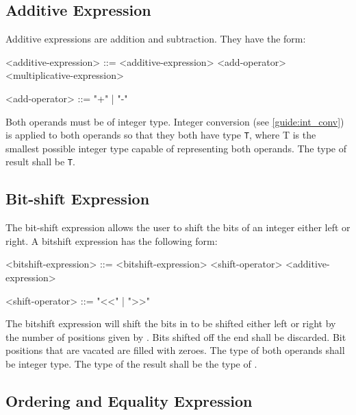 \subsection{Additive Expression} \label{guide:add_expr}

Additive expressions are addition and subtraction. They have the form: 

\begin{minip}
\begin{grammar}
<additive-expression> ::= <additive-expression> 
<add-operator> <multiplicative-expression>

<add-operator> ::= "+" | "-"
\end{grammar}
\end{minip}

Both operands must be of integer type. Integer conversion (see \ref{guide:int_conv}) is applied to both operands so that they both have type \texttt{T}, where T is the smallest possible integer type capable of representing both operands. The type of result shall be \texttt{T}.

\subsection{Bit-shift Expression} \label{guide:bitshift_expr}

The bit-shift expression allows the user to shift the bits of an integer either left or right. A bitshift expression has the following form:

\begin{minip}
\begin{grammar}
<bitshift-expression> ::= <bitshift-expression> 
<shift-operator> <additive-expression>

<shift-operator> ::= "<<" | ">>"
\end{grammar}
\end{minip}

The bitshift expression will shift the bits in  to be shifted either left or right by the number of positions given by . Bits shifted off the end shall be discarded. Bit positions that are vacated are filled with zeroes. The type of both operands shall be integer type. The type of the result shall be the type of .

\subsection{Ordering and Equality Expression} \label{guide:ordering_expr}


